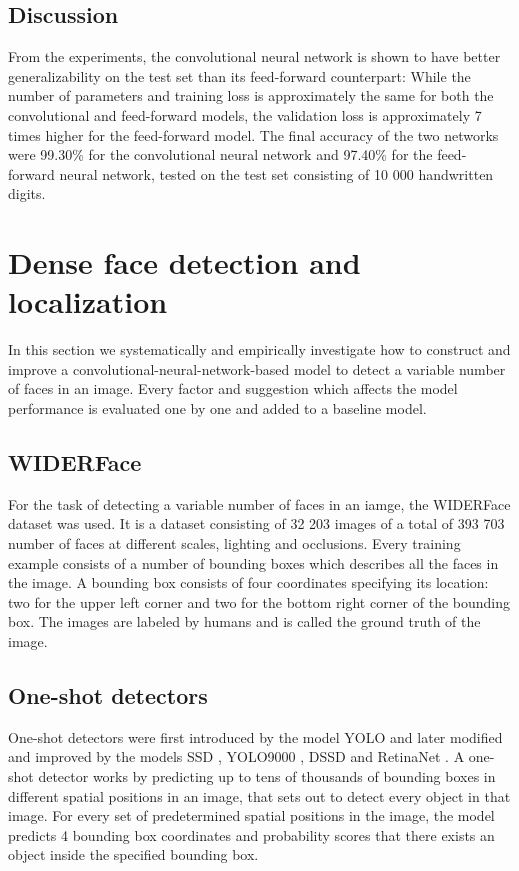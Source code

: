 \documentclass[a4paper, twoside]{article}
\begin{document}
\subsection{Discussion}

From the experiments, the convolutional neural network is shown to have better generalizability on the test set than its feed-forward counterpart: While the number of parameters and training loss is approximately the same for both the convolutional and feed-forward models, the validation loss is approximately 7 times higher for the feed-forward model. The final accuracy of the two networks were 99.30\% for the convolutional neural network and 97.40\% for the feed-forward neural network, tested on the test set consisting of 10 000 handwritten digits. 

\section{Dense face detection and localization}
In this section we systematically and empirically investigate how to construct and improve a convolutional-neural-network-based model to detect a variable number of faces in an image. Every factor and suggestion which affects the model performance is evaluated one by one and added to a baseline model.

\subsection{WIDERFace}
For the task of detecting a variable number of faces in an iamge, the WIDERFace dataset \cite{WIDERFace} was used. It is a dataset consisting of 32 203 images of a total of 393 703 number of faces at different scales, lighting and occlusions. Every training example consists of a number of bounding boxes which describes all the faces in the image. A bounding box consists of four coordinates specifying its location: two for the upper left corner and two for the bottom right corner of the bounding box. The images are labeled by humans and is called the ground truth of the image.

\subsection{One-shot detectors}
One-shot detectors were first introduced by the model YOLO \cite{yolo} and later modified and improved by the models SSD \cite{ssd}, YOLO9000 \cite{yolo9000}, DSSD \cite{dssd} and RetinaNet \cite{retinanet}. A one-shot detector works by predicting up to tens of thousands of bounding boxes in different spatial positions in an image, that sets out to detect every object in that image. For every set of predetermined spatial positions in the image, the model predicts 4 bounding box coordinates and probability scores that there exists an object inside the specified bounding box.
\end{document}
